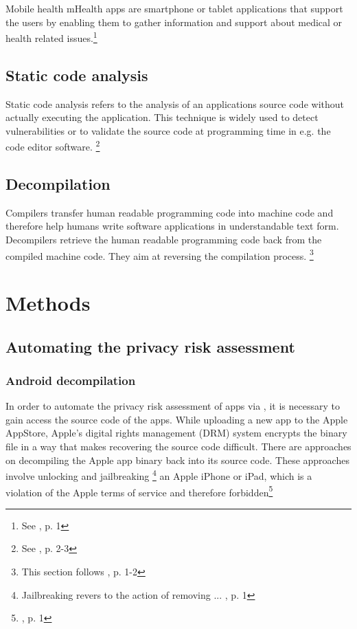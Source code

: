 \documentclass[
	a4paper,
	oneside,
	12pt,
	liststotocnumbered
]{article}
\let\cite\textcite
\begin{document}
Mobile health \acs{mHealth} apps are smartphone or tablet applications that support the users by enabling them to gather information and support about medical or health related issues.\footnote{See \cite{Dehling2015b}, p. 1}

\subsection{Static code analysis}

Static code analysis refers to the analysis of an applications source code without actually executing the application. 
This technique is widely used to detect vulnerabilities or to validate the source code at programming time in e.g. the code editor software. \footnote{See \cite{bardas2010static}, p. 2-3}

\subsection{Decompilation}

Compilers transfer human readable programming code into machine code and therefore help humans write software applications in understandable text form. 
Decompilers retrieve the human readable programming code back from the compiled machine code. 
They aim at reversing the compilation process.
\footnote{This section follows \cite{nolan2012decompiling}, p. 1-2}

\section{Methods}

\subsection{Automating the privacy risk assessment}

\subsubsection{Android decompilation}

In order to automate the privacy risk assessment of \mH apps via \sca, it is necessary to gain access the source code of the apps. 
While uploading a new app to the Apple AppStore, Apple's digital rights management (\acs{DRM}) system encrypts the binary file in a way that makes recovering the source code difficult. 
There are approaches on decompiling the Apple app binary back into its source code.
These approaches involve unlocking and jailbreaking
\footnote{Jailbreaking revers to the action of removing ... \cite{Kweller2010}, p. 1}
an Apple iPhone or iPad, which is a violation of the Apple terms of service and therefore forbidden\footnote{\cite{Kweller2010}, p. 1}
\end{document}
